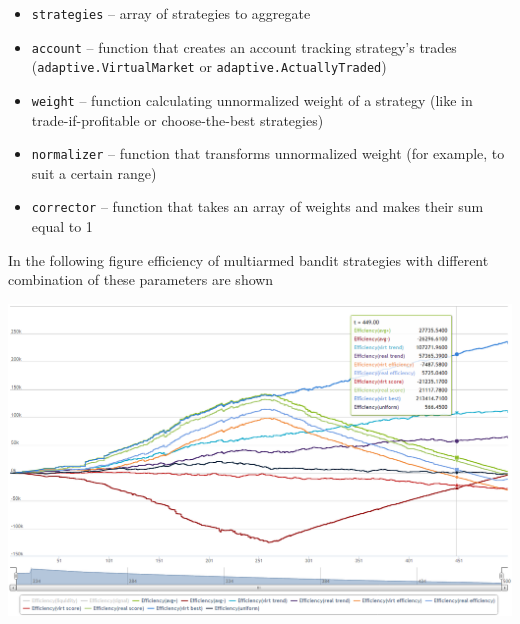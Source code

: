 \documentclass[a4paper,11pt]{article}
\begin{document}
\begin{itemize}
\itemsep1pt\parskip0pt
\item
  \texttt{strategies} -- array of strategies to aggregate
\item
  \texttt{account} -- function that creates an account tracking
  strategy's trades (\texttt{adaptive.VirtualMarket} or
  \texttt{adaptive.ActuallyTraded})
\item
  \texttt{weight} -- function calculating unnormalized weight of a
  strategy (like in trade-if-profitable or choose-the-best strategies)
\item
  \texttt{normalizer} -- function that transforms unnormalized weight
  (for example, to suit a certain range)
\item
  \texttt{corrector} -- function that takes an array of weights and
  makes their sum equal to 1
\end{itemize}

In the following figure efficiency of multiarmed bandit
strategies with different combination of these parameters are shown

\centerline{\includegraphics[width=1\linewidth]{talks/multiarmedbandit.png}}
\end{document}

